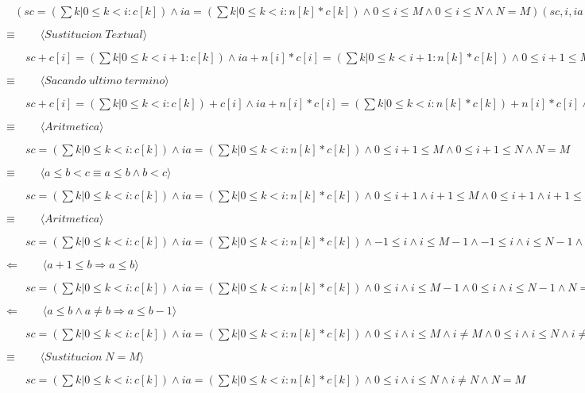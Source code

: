 \documentclass[hidelinks]{article}
\begin{document}
$\quad (sc=(\sum k|0 \leq k < i: c[k]) \land ia=(\sum k|0 \leq k < i: n[k]*c[k]) \land 0 \leq i \leq M \land 0 \leq i \leq N \land N=M)(sc, i, ia := c[i]+sc, i + 1, ia+n[i]*c[i])$\par
$\equiv  \qquad \langle Sustitucion \; Textual \rangle$ \par
$\qquad sc + c[i]=(\sum k|0 \leq k < i+1: c[k]) \land ia+n[i]*c[i]=(\sum k|0 \leq k < i+1: n[k]*c[k]) \land 0 \leq i+1 \leq M \land 0 \leq i+1 \leq N  \land N=M$ \par
$\equiv  \qquad \langle Sacando \; ultimo \; termino \rangle$ \par
$\qquad sc + c[i]=(\sum k|0 \leq k < i: c[k])+c[i] \land ia+n[i]*c[i]=(\sum k|0 \leq k < i: n[k]*c[k])+n[i]*c[i] \land 0 \leq i+1 \leq M \land 0 \leq i+1 \leq N  \land N=M$ \par
$\equiv  \qquad \langle Aritmetica \rangle$ \par
$\qquad sc=(\sum k|0 \leq k < i: c[k]) \land ia=(\sum k|0 \leq k < i: n[k]*c[k]) \land 0 \leq i+1 \leq M \land 0 \leq i+1 \leq N  \land N=M$ \par
$\equiv  \qquad \langle a \leq b <c \equiv a \leq b \land b < c \rangle$ \par
$\qquad sc=(\sum k|0 \leq k < i: c[k]) \land ia=(\sum k|0 \leq k < i: n[k]*c[k]) \land 0 \leq i+1 \land i+1 \leq M \land 0 \leq i+1 \land i+1 \leq N  \land N=M$ \par
$\equiv  \qquad \langle Aritmetica \rangle$ \par
$\qquad sc=(\sum k|0 \leq k < i: c[k]) \land ia=(\sum k|0 \leq k < i: n[k]*c[k]) \land -1 \leq i \land i \leq M-1 \land -1 \leq i \land i \leq N-1  \land N=M$ \par
$\Leftarrow  \qquad \langle a+1 \leq b \Rightarrow a \leq b \rangle$ \par
$\qquad sc=(\sum k|0 \leq k < i: c[k]) \land ia=(\sum k|0 \leq k < i: n[k]*c[k]) \land 0 \leq i \land i \leq M-1 \land 0 \leq i \land i \leq N-1  \land N=M$ \par
$\Leftarrow  \qquad \langle a \leq b \land a \neq b \Rightarrow a \leq b-1 \rangle$ \par
$\qquad sc=(\sum k|0 \leq k < i: c[k]) \land ia=(\sum k|0 \leq k < i: n[k]*c[k]) \land 0 \leq i \land i \leq M \land i \neq M \land 0 \leq i \land i \leq N \land i \neq N  \land N=M$ \par
$\equiv  \qquad \langle Sustitucion \; N=M \rangle$ \par
$\qquad sc=(\sum k|0 \leq k < i: c[k]) \land ia=(\sum k|0 \leq k < i: n[k]*c[k]) \land 0 \leq i \land i \leq N \land i \neq N  \land N=M$ \par
\end{document}
